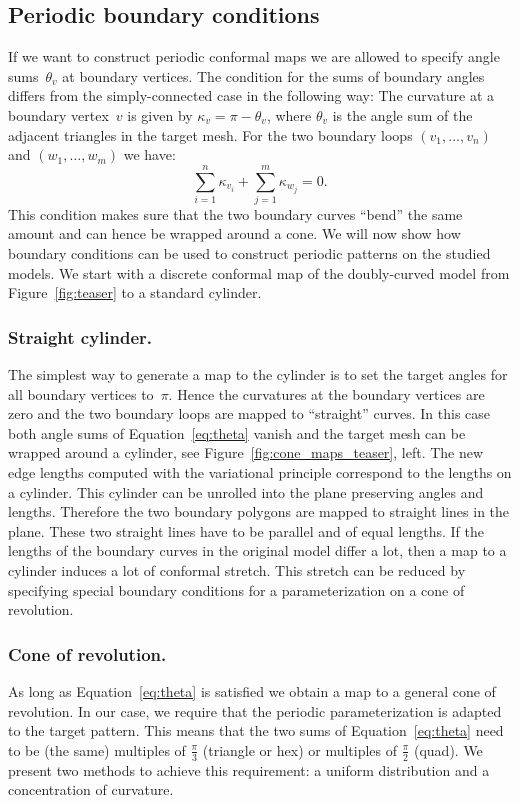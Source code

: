 \documentclass[article.tex]{subfiles}
\begin{document}
\subsection{Periodic boundary conditions}
\label{sec:boundary}

If we want to construct periodic conformal maps we are allowed
to specify angle sums~$\theta_v$ at boundary vertices. The condition
for the sums of boundary angles differs from the simply-connected case in the
following way: The curvature at a boundary vertex~$v$ is given by
$\kappa_v = \pi -\theta_v$, where $\theta_v$ is the angle sum of the
adjacent triangles in the target mesh. For the two boundary loops
$(v_1, \ldots, v_n)$ and $(w_1, \ldots, w_m)$ we have:
\begin{equation}
\sum_{i=1}^n \kappa_{v_i} + \sum_{j=1}^m \kappa_{w_j} = 0. \label{eq:theta}
\end{equation}
This condition makes sure that the two boundary curves ``bend'' the
same amount and can hence be wrapped around a cone. 
We will now show how boundary conditions can be
used to construct periodic patterns on the studied models. We start
with a discrete conformal map of the doubly-curved model from Figure~\ref{fig:teaser} 
to a standard cylinder. 

\subsubsection{Straight cylinder.}
The simplest way to generate a map to the cylinder is to set the
target angles for all boundary vertices to~$\pi$. Hence the curvatures
at the boundary vertices are zero and the two boundary loops are
mapped to ``straight'' curves. 
In this case both angle sums of Equation~\eqref{eq:theta}
vanish and the target mesh can be wrapped around a cylinder, see 
Figure~\ref{fig:cone_maps_teaser}, left. The new edge lengths
computed with the variational principle correspond to the lengths on a
cylinder. This cylinder can be unrolled into the plane preserving angles
and lengths. Therefore the two boundary polygons are mapped to straight lines
in the plane. These two straight lines have to be parallel and of
equal lengths.
%
If the lengths of the boundary curves in the original model differ a
lot, then a map to a cylinder induces a lot of conformal stretch. This stretch
can be reduced by specifying special boundary conditions for a
parameterization on a cone of revolution.

\subsubsection{Cone of revolution.}
As long as Equation~\eqref{eq:theta} is satisfied we obtain a map to a
general cone of revolution. In our case, we require that the
periodic parameterization is adapted to the target pattern. 
This means that the two sums of Equation~\eqref{eq:theta} need to 
be (the same) multiples of
$\tfrac{\pi}{3}$ (triangle or hex) or multiples of $\tfrac{\pi}{2}$
(quad). We present two methods to achieve this requirement: a uniform
distribution and a concentration of curvature.
\end{document}

